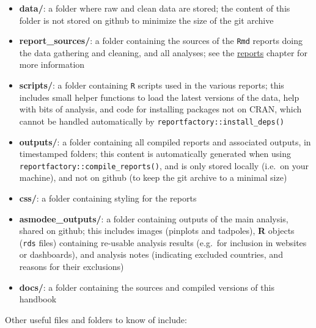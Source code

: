 \documentclass[]{book}
\begin{document}
\begin{itemize}
\item
  \textbf{data/}: a folder where raw and clean data are stored; the content of this
  folder is not stored on github to minimize the size of the git archive
\item
  \textbf{report\_sources/}: a folder containing the sources of the \texttt{Rmd} reports doing
  the data gathering and cleaning, and all analyses; see the \protect\hyperlink{reports}{reports}
  chapter for more information
\item
  \textbf{scripts/}: a folder containing \texttt{R} scripts used in the various reports; this
  includes small helper functions to load the latest versions of the data, help
  with bits of analysis, and code for installing packages not on CRAN, which
  cannot be handled automatically by \texttt{reportfactory::install\_deps()}
\item
  \textbf{outputs/}: a folder containing all compiled reports and associated outputs,
  in timestamped folders; this content is automatically generated when using
  \texttt{reportfactory::compile\_reports()}, and is only stored locally (i.e.~on your
  machine), and not on github (to keep the git archive to a minimal size)
\item
  \textbf{css/}: a folder containing styling for the reports
\item
  \textbf{asmodee\_outputs/}: a folder containing outputs of the main analysis, shared on
  github; this includes images (pinplots and tadpoles), \textbf{R} objects (\texttt{rds}
  files) containing re-usable analysis results (e.g.~for inclusion in websites
  or dashboards), and analysis notes (indicating excluded countries, and reasons
  for their exclusions)
\item
  \textbf{docs/}: a folder containing the sources and compiled versions of this
  handbook
\end{itemize}

Other useful files and folders to know of include:
\end{document}
